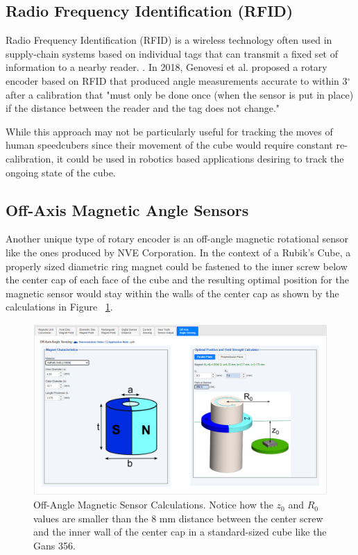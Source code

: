 \subsection{Radio Frequency Identification (RFID)}
\label{subsec:rfid}
Radio Frequency Identification (RFID) is a wireless technology often used in supply-chain systems \cite{rfid-rotary-encoder} based on individual tags that can transmit a fixed set of information to a nearby reader. \cite{fda-rfid}.
In 2018, Genovesi et al. proposed a rotary encoder based on RFID that produced angle measurements accurate to within 3$^\circ$ after a calibration that "must only be done once (when the sensor is put in place) if the distance between the reader and the tag does not change." \cite{rfid-rotary-encoder}

While this approach may not be particularly useful for tracking the moves of human speedcubers since their movement of the cube would require constant re-calibration, it could be used in robotics based applications desiring to track the ongoing state of the cube.

\subsection{Off-Axis Magnetic Angle Sensors}
\label{subsec:magnetic-angle-sensors}
Another unique type of rotary encoder is an off-angle magnetic rotational sensor like the ones produced by NVE Corporation. \cite{nve-mag-sensor} In the context of a Rubik's Cube, a properly sized diametric ring magnet could be fastened to the inner screw below the center cap of each face of the cube and the resulting optimal position for the magnetic sensor would stay within the walls of the center cap as shown by the calculations in Figure ~\ref{fig:nve-mag-calculations}.

\begin{figure}[h]
    \centering
    \includegraphics[width=\linewidth]{Figures/3 State of the Art/nve-mag-calculations.png}
    \decoRule
    \caption[Off-Angle Magnetic Sensor Calculations]{Off-Angle Magnetic Sensor Calculations. Notice how the $z_0$ and $R_0$ values are smaller than the 8 mm distance between the center screw and the inner wall of the center cap in a standard-sized cube like the Gans 356. \cite{nve-mag-sensor-calculations}}
    \label{fig:nve-mag-calculations}
\end{figure}


